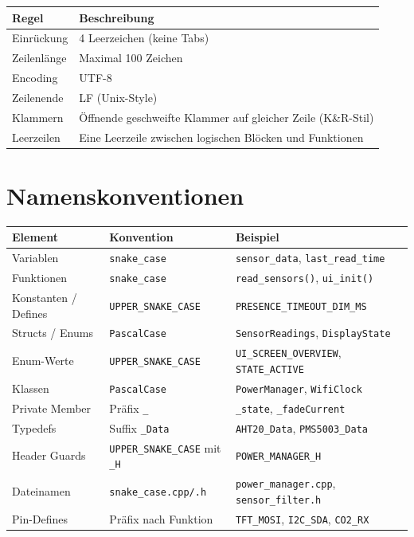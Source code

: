 \documentclass[a4paper,11pt]{article}
\begin{document}
\begin{tabularx}{\textwidth}{lX}
\toprule
\rowcolor{tableheader}
\textbf{Regel} & \textbf{Beschreibung} \\
\midrule
Einrückung & 4 Leerzeichen (keine Tabs) \\
Zeilenlänge & Maximal 100 Zeichen \\
Encoding & UTF-8 \\
Zeilenende & LF (Unix-Style) \\
Klammern & Öffnende geschweifte Klammer auf gleicher Zeile (K\&R-Stil) \\
Leerzeilen & Eine Leerzeile zwischen logischen Blöcken und Funktionen \\
\bottomrule
\end{tabularx}

\section{Namenskonventionen}

\begin{tabularx}{\textwidth}{llX}
\toprule
\rowcolor{tableheader}
\textbf{Element} & \textbf{Konvention} & \textbf{Beispiel} \\
\midrule
Variablen & \texttt{snake\_case} & \texttt{sensor\_data}, \texttt{last\_read\_time} \\
Funktionen & \texttt{snake\_case} & \texttt{read\_sensors()}, \texttt{ui\_init()} \\
Konstanten / Defines & \texttt{UPPER\_SNAKE\_CASE} & \texttt{PRESENCE\_TIMEOUT\_DIM\_MS} \\
Structs / Enums & \texttt{PascalCase} & \texttt{SensorReadings}, \texttt{DisplayState} \\
Enum-Werte & \texttt{UPPER\_SNAKE\_CASE} & \texttt{UI\_SCREEN\_OVERVIEW}, \texttt{STATE\_ACTIVE} \\
Klassen & \texttt{PascalCase} & \texttt{PowerManager}, \texttt{WifiClock} \\
Private Member & Präfix \texttt{\_} & \texttt{\_state}, \texttt{\_fadeCurrent} \\
Typedefs & Suffix \texttt{\_Data} & \texttt{AHT20\_Data}, \texttt{PMS5003\_Data} \\
Header Guards & \texttt{UPPER\_SNAKE\_CASE} mit \texttt{\_H} & \texttt{POWER\_MANAGER\_H} \\
Dateinamen & \texttt{snake\_case.cpp/.h} & \texttt{power\_manager.cpp}, \texttt{sensor\_filter.h} \\
Pin-Defines & Präfix nach Funktion & \texttt{TFT\_MOSI}, \texttt{I2C\_SDA}, \texttt{CO2\_RX} \\
\bottomrule
\end{tabularx}
\end{document}
